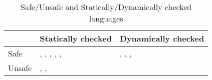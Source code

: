 \begin{table*}[ht]
\footnotesize
\centering
\caption{Safe/Unsafe and Statically/Dynamically checked languages}
\label{table:introduction:langs}
\begin{tabular}{|l||l|l|}
    \hline
            & Statically checked    & Dynamically checked \\
    \hline\hline
    Safe    & \haskell{}, \ml{}, \java{}, \csharp{}, \rust{}, \etc{} & \python{}, \lisp{}, \racket{}, \etc{} \\
    Unsafe  & \cc{}, \cpp{}, \etc{} & \\
    \hline
\end{tabular}
\end{table*}
